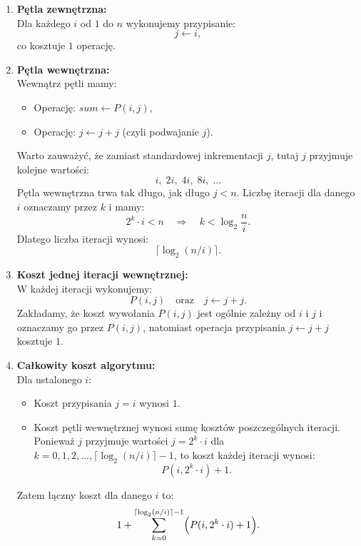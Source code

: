 \documentclass[12pt]{article}
\begin{document}
\begin{enumerate}
    \item \textbf{Pętla zewnętrzna:} \\
    Dla każdego \(i\) od \(1\) do \(n\) wykonujemy przypisanie:
    \[
    j \gets i,
    \]
    co kosztuje \(1\) operację.

    \item \textbf{Pętla wewnętrzna:} \\
    Wewnątrz pętli mamy:
    \begin{itemize}
        \item Operację: \(sum \gets P(i,j)\),
        \item Operację: \(j \gets j + j\) (czyli podwajanie \(j\)).
    \end{itemize}
    Warto zauważyć, że zamiast standardowej inkrementacji \(j\), tutaj \(j\) przyjmuje kolejne wartości:
    \[
    i,\; 2i,\; 4i,\; 8i,\; \dots
    \]
    Pętla wewnętrzna trwa tak długo, jak długo \(j < n\). Liczbę iteracji dla danego \(i\) oznaczamy przez \(k\) i mamy:
    \[
    2^k \cdot i < n \quad \Longrightarrow \quad k < \log_2\frac{n}{i}.
    \]
    Dlatego liczba iteracji wynosi:
    \[
    \lceil \log_2(n/i) \rceil.
    \]
    
    \item \textbf{Koszt jednej iteracji wewnętrznej:} \\
    W każdej iteracji wykonujemy:
    \[
    P(i,j) \quad \text{oraz} \quad j \gets j+j.
    \]
    Zakładamy, że koszt wywołania \(P(i,j)\) jest ogólnie zależny od \(i\) i \(j\) i oznaczamy go przez \(P(i,j)\), natomiast operacja przypisania \(j \gets j+j\) kosztuje \(1\).

    \item \textbf{Całkowity koszt algorytmu:} \\
    Dla ustalonego \(i\):
    \begin{itemize}
        \item Koszt przypisania \(j = i\) wynosi \(1\).
        \item Koszt pętli wewnętrznej wynosi sumę kosztów poszczególnych iteracji. Ponieważ \(j\) przyjmuje wartości \(j = 2^k \cdot i\) dla \(k = 0, 1, 2, \dots, \lceil \log_2(n/i) \rceil - 1\), to koszt każdej iteracji wynosi:
        \[
        P(i,2^k\cdot i) + 1.
        \]
    \end{itemize}
    Zatem łączny koszt dla danego \(i\) to:
    \[
    1 + \sum_{k=0}^{\lceil \log_2(n/i) \rceil - 1} \Bigl(P(i,2^k\cdot i) + 1\Bigr).
    \]
    

\end{enumerate}
\end{document}
